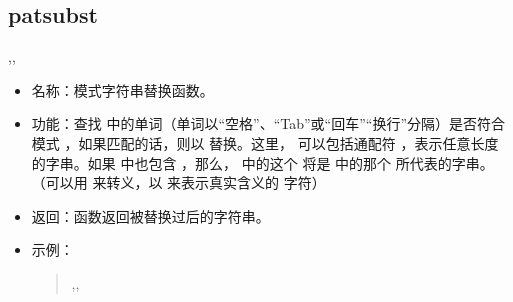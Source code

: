 \documentclass[a4paper,10pt]{sphinxmanual}
\begin{document}
\subsection{patsubst}
\label{\detokenize{functions:patsubst}}
\begin{sphinxVerbatim}[commandchars=\\\{\}]
 \PYGZlt{}\PYGZgt{},\PYGZlt{}\PYGZgt{},\PYGZlt{}\PYGZgt{}
\end{sphinxVerbatim}
\begin{itemize}
\item {} 
名称：模式字符串替换函数。

\item {} 
功能：查找  中的单词（单词以“空格”、“Tab”或“回车”“换行”分隔）是否符合模式
 ，如果匹配的话，则以  替换。这里，  可以包括通配符 \sphinxcode{\sphinxupquote{\%}} ，表示任意长度的字串。如果  中也包含 \sphinxcode{\sphinxupquote{\%}} ，那么，
 中的这个 \sphinxcode{\sphinxupquote{\%}} 将是  中的那个 \sphinxcode{\sphinxupquote{\%}} 所代表的字串。（可以用 \sphinxcode{\sphinxupquote{\textbackslash{}}} 来转义，以 \sphinxcode{\sphinxupquote{\textbackslash{}\%}} 来表示真实含义的 \sphinxcode{\sphinxupquote{\%}} 字符）

\item {} 
返回：函数返回被替换过后的字符串。

\item {} 
示例：
\begin{quote}

\begin{sphinxVerbatim}[commandchars=\\\{\}]
 \PYGZpc{},\PYGZpc{}, 
\end{sphinxVerbatim}
\end{quote}

\end{itemize}
\end{document}
